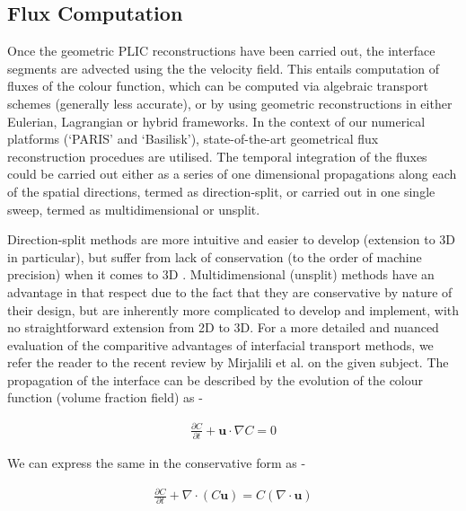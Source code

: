 \subsection*{Flux Computation}
Once the geometric PLIC reconstructions have been carried out, 
the interface segments are advected using the the velocity field. 
This entails computation of fluxes of the colour function, which 
can be computed via algebraic transport schemes (generally less accurate), 
or by using geometric reconstructions in either Eulerian, Lagrangian or hybrid frameworks.
In the context of our numerical platforms (`PARIS' and `Basilisk'), 
state-of-the-art   
geometrical flux reconstruction procedues are utilised. 
The temporal integration of the fluxes could be carried out either as a 
series of one dimensional propagations along each of the spatial directions, 
termed as direction-split, or carried out in one single sweep, 
termed as multidimensional or unsplit.

Direction-split methods are more intuitive and easier to develop (extension to 
3D in particular), but suffer from lack of conservation (to the order of 
machine precision) when it comes to 3D . 
Multidimensional (unsplit) methods have an advantage in that respect due to the 
fact that they are conservative by nature of their design, but are inherently 
more complicated to develop and implement, with no straightforward extension from 2D to 3D.    
For a more detailed and nuanced evaluation of the comparitive advantages of 
interfacial transport methods, we refer the reader to the recent review by 
Mirjalili et al. \cite{mirjalili2017interface} on the given subject.     
The propagation of the interface can be described by the evolution of
the colour function (volume fraction field) as - 

\begin{align} 
	\frac{\partial C}{\partial t} + \boldsymbol{u} \cdot \nabla C = 0  	
\label{cvof_non}
\end{align}

We can express the same in the conservative form as - 

\begin{align} 
	\frac{\partial C}{\partial t} + \nabla \cdot \left(C \boldsymbol{u}\right) = C \left(\nabla \cdot \boldsymbol{u}\right) 	
\label{cvof_con}
\end{align}

